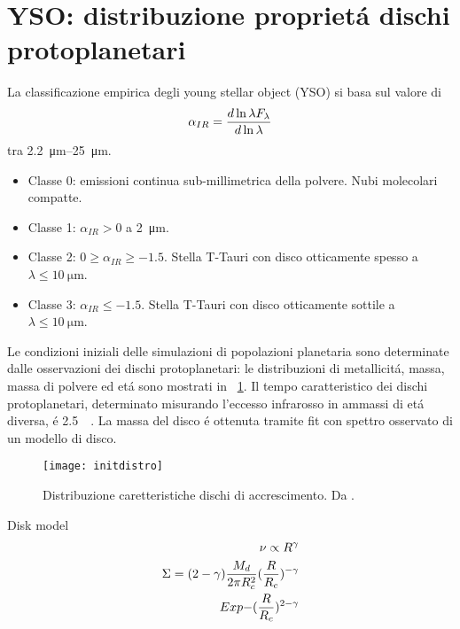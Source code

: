 \section{YSO: distribuzione propriet\'a dischi protoplanetari}

La classificazione empirica degli young stellar object (YSO) si basa sul valore di
\begin{equation}
\alpha_{IR}=\frac{d \ln{\lambda F_{\lambda}}}{d \ln{\lambda}}
\end{equation}
tra \SIrange{2.2}{25}{\micro\meter}.

\begin{itemize}
\item Classe 0: emissioni continua sub-millimetrica della polvere. Nubi molecolari compatte.
\item Classe 1: $\alpha_{IR}>0$ a \SI{2}{\micro\meter}.
\item Classe 2: $0\geq\alpha_{IR}\geq-1.5$. Stella T-Tauri con disco otticamente spesso a $\lambda\leq\SI{10}{\micro\meter}$.
\item Classe 3: $\alpha_{IR}\leq-1.5$. Stella T-Tauri con disco otticamente sottile a $\lambda\leq\SI{10}{\micro\meter}$.
\end{itemize}

Le condizioni iniziali delle simulazioni di popolazioni planetaria sono determinate dalle osservazioni dei dischi protoplanetari: le distribuzioni di metallicit\'a, massa, massa di polvere ed et\'a sono mostrati in ~\ref{fig:initdistro}. Il tempo caratteristico dei dischi protoplanetari, determinato misurando l'eccesso infrarosso in ammassi di et\'a diversa, \'e \SI{2.5}{\mega\year}. La massa del disco \'e ottenuta tramite fit con spettro osservato di un modello di disco.

\begin{figure}[!ht]
\texttt{[image: initdistro]}
\caption{Distribuzione caretteristiche dischi di accrescimento. Da \cite{mordasini2018planetary}.}\label{fig:initdistro}\end{figure}

\begin{workout}
Disk model
\begin{align}
\nu\propto R^{\gamma}\\
\Sigma=(2-\gamma)\frac{M_d}{2\pi R_c^2}(\frac{R}{R_c})^{-\gamma}\\Exp{-(\frac{R}{R_c})^{2-\gamma}}
\end{align}
\end{workout}


